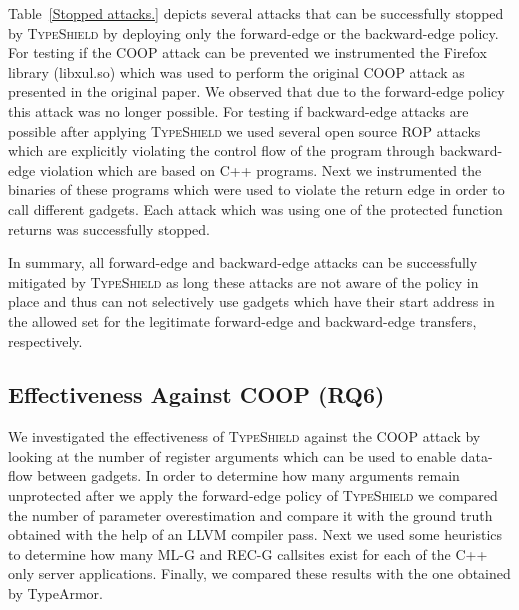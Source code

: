 Table~\ref{Stopped attacks.} depicts several attacks that can be successfully stopped by \textsc{TypeShield}
by deploying only the forward-edge or the backward-edge policy.
For testing if the COOP attack can be prevented we instrumented the Firefox library (libxul.so) which was used to perform the original COOP
attack as presented in the original paper. We observed that due to the forward-edge policy this attack was no longer possible.
For testing if backward-edge attacks are possible after applying \textsc{TypeShield} we used several 
open source ROP attacks which are explicitly violating the control flow of the program through
backward-edge violation which are based on C++ programs.
Next we instrumented the binaries of these programs which were used to violate the return edge in order to call different gadgets.
Each attack which was using one of the protected function returns was successfully stopped. 
 
In summary, all forward-edge and backward-edge attacks can be successfully mitigated by \textsc{TypeShield} as long these attacks are not 
aware of the policy in place and thus can not selectively use gadgets which have their start address in the 
allowed set for the legitimate forward-edge and backward-edge transfers, respectively.

\subsection{Effectiveness Against COOP (RQ6)}
\label{RQ8: Effectiveness Against COOP}
We investigated the effectiveness of \textsc{TypeShield} against the COOP
attack by looking at the number of register arguments which can be used to enable 
data-flow between gadgets. In order to determine how many arguments 
remain unprotected after we apply the forward-edge policy of \textsc{TypeShield}
we compared the number of parameter overestimation and compare it with the ground truth
obtained with the help of an LLVM compiler pass. Next we used some heuristics to determine 
how many ML-G and REC-G callsites exist for each of the C++ only server applications.
Finally, we compared these results with the one obtained by TypeArmor.

